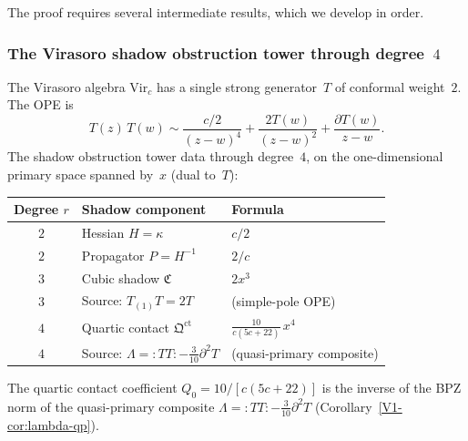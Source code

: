 The proof requires several intermediate results, which
we develop in order.

\subsubsection{The Virasoro shadow obstruction tower through degree~$4$}

\begin{computation}
The Virasoro algebra $\mathrm{Vir}_c$ has a single strong
generator~$T$ of conformal weight~$2$. The OPE is
\begin{equation}%
T(z)\,T(w) \sim
\frac{c/2}{(z-w)^4}
+ \frac{2T(w)}{(z-w)^2}
+ \frac{\partial T(w)}{z-w}.
\end{equation}
The shadow obstruction tower data through degree~$4$, on the
one-dimensional primary space spanned by~$x$
(dual to~$T$):

\begin{center}
\renewcommand{\arraystretch}{1.5}
\begin{tabular}{cll}
\toprule
Degree $r$ & Shadow component & Formula \\
\midrule
$2$ & Hessian $H = \kappa$ & $c/2$ \\
$2$ & Propagator $P = H^{-1}$ & $2/c$ \\
$3$ & Cubic shadow $\mathfrak{C}$ & $2x^3$ \\
$3$ & Source: $T_{(1)}T = 2T$ & (simple-pole OPE) \\
$4$ & Quartic contact $\mathfrak{Q}^{\mathrm{ct}}$ &
 $\displaystyle\frac{10}{c(5c+22)}\,x^4$ \\
$4$ & Source: $\Lambda = {:}TT{:}
 - \tfrac{3}{10}\partial^2 T$ & (quasi-primary composite)\\
\bottomrule
\end{tabular}
\end{center}

\noindent The quartic contact coefficient
$Q_0 = 10/[c(5c+22)]$ is the inverse of the BPZ norm of
the quasi-primary composite
$\Lambda = {:}TT{:} - \frac{3}{10}\partial^2 T$
(Corollary~\ref{V1-cor:lambda-qp}).
\end{computation}

